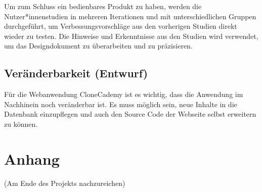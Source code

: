 \documentclass[accentcolor=tud0b,12pt,paper=a4]{tudreport}
\begin{document}
Um zum Schluss ein bedienbares Produkt zu haben, werden die Nutzer*innenstudien in mehreren Iterationen und mit unterschiedlichen Gruppen durchgeführt, um Verbessungsvorschläge aus den vorherigen Studien direkt wieder zu testen. Die Hinweise und Erkenntnisse aus den Studien wird verwendet, um das Designdokument zu überarbeiten und zu präzisieren.

\section{Veränderbarkeit (Entwurf)}
Für die Webanwendung CloneCademy ist es wichtig, dass die Anwendung im Nachhinein noch veränderbar ist. Es muss möglich sein, neue Inhalte in die Datenbank einzupflegen und auch den Source Code der Webseite selbst erweitern zu können.




\appendix
	\chapter{Anhang}
		(Am Ende des Projekts nachzureichen)\\
\end{document}
